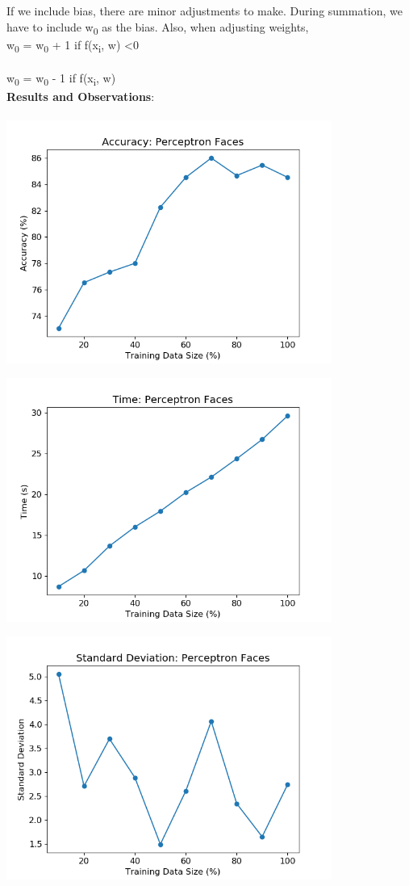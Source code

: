 \documentclass{article}
\begin{document}
If we include bias, there are minor adjustments to make. During summation, we have to include w\textsubscript{0} as the bias. Also, when adjusting weights, \\ w\textsubscript{0} = w\textsubscript{0} + 1 if f(x\textsubscript{i}, w) \textless  0 \\ \\ w\textsubscript{0} = w\textsubscript{0} - 1 if f(x\textsubscript{i}, w) \\
 
\textbf{Results and Observations}:\\
\\

\includegraphics[width=0.8\textwidth,height=0.8\textheight,keepaspectratio]{p_f.png}

\includegraphics[width=0.8\textwidth,height=0.8\textheight,keepaspectratio]{p_f-t.png}

\includegraphics[width=0.8\textwidth,height=0.8\textheight,keepaspectratio]{std_pf.png}
\end{document}
